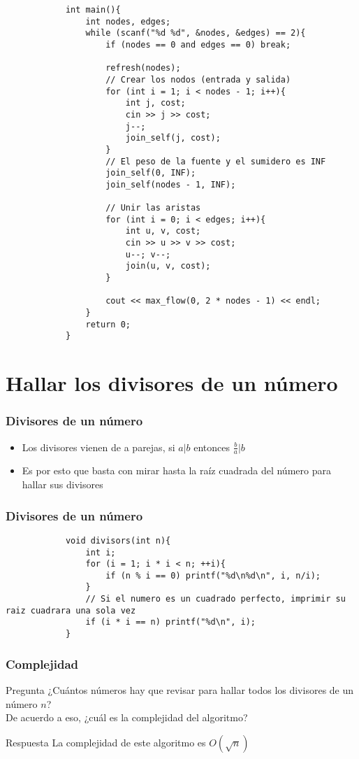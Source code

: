 \documentclass{beamer}
\begin{document}
\begin{frame}
\begin{lstlisting}
			int main(){
			    int nodes, edges;
			    while (scanf("%d %d", &nodes, &edges) == 2){
			        if (nodes == 0 and edges == 0) break;

			        refresh(nodes);
			        // Crear los nodos (entrada y salida)
			        for (int i = 1; i < nodes - 1; i++){
			            int j, cost; 
			            cin >> j >> cost;
			            j--;
			            join_self(j, cost);
			        }
			        // El peso de la fuente y el sumidero es INF
			        join_self(0, INF);
			        join_self(nodes - 1, INF);

			        // Unir las aristas
			        for (int i = 0; i < edges; i++){
			            int u, v, cost;
			            cin >> u >> v >> cost;
			            u--; v--;
			            join(u, v, cost);
			        }

			        cout << max_flow(0, 2 * nodes - 1) << endl;
			    }
			    return 0;
			}
		\end{lstlisting}
	\end{frame}

\section[Divisores]{Hallar los divisores de un número}
	
	\begin{frame}
		\frametitle{Divisores de un número}
		\begin{itemize}
			\item Los divisores vienen de a parejas, si $a | b$ entonces $\frac{b}{a} | b$
			\item Es por esto que basta con mirar hasta la raíz cuadrada del número para hallar sus divisores
		\end{itemize}
	\end{frame}
	
	\begin{frame}[fragile]
		\frametitle{Divisores de un número}
		\begin{lstlisting}
			void divisors(int n){
			    int i;
			    for (i = 1; i * i < n; ++i){
			        if (n % i == 0) printf("%d\n%d\n", i, n/i);
			    }
			    // Si el numero es un cuadrado perfecto, imprimir su raiz cuadrara una sola vez
			    if (i * i == n) printf("%d\n", i);
			}
		\end{lstlisting}
	\end{frame}
	
	\begin{frame}
		\frametitle{Complejidad}
		\begin{alertblock}{Pregunta}
			¿Cuántos números hay que revisar para hallar todos los divisores de un número $n$?\\
			De acuerdo a eso, ¿cuál es la complejidad del algoritmo?
		\end{alertblock}
		\pause
		\begin{exampleblock}{Respuesta}
			La complejidad de este algoritmo es $O(\sqrt{n})$
		\end{exampleblock}
	\end{frame}
\end{document}
